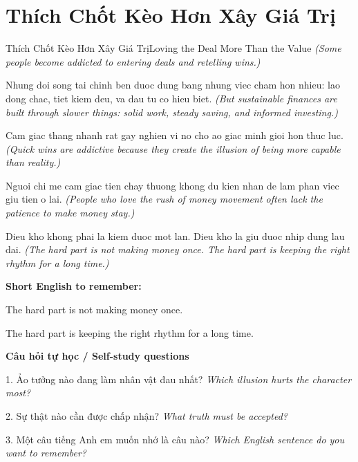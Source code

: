 \section{Thích Chốt Kèo Hơn Xây Giá Trị}
\begin{truyen}{Thích Chốt Kèo Hơn Xây Giá Trị}{Loving the Deal More Than the Value}
\textit{(Some people become addicted to entering deals and retelling wins.)}

Nhung doi song tai chinh ben duoc dung bang nhung viec cham hon nhieu: lao dong chac, tiet kiem deu, va dau tu co hieu biet.
\textit{(But sustainable finances are built through slower things: solid work, steady saving, and informed investing.)}

Cam giac thang nhanh rat gay nghien vi no cho ao giac minh gioi hon thuc luc.
\textit{(Quick wins are addictive because they create the illusion of being more capable than reality.)}

Nguoi chi me cam giac tien chay thuong khong du kien nhan de lam phan viec giu tien o lai.
\textit{(People who love the rush of money movement often lack the patience to make money stay.)}

\end{truyen}

\begin{baihoc}
Dieu kho khong phai la kiem duoc mot lan. Dieu kho la giu duoc nhip dung lau dai.
\textit{(The hard part is not making money once. The hard part is keeping the right rhythm for a long time.)}
\end{baihoc}

\begin{ghinhoanh}
\textbf{Short English to remember:}

The hard part is not making money once.

The hard part is keeping the right rhythm for a long time.

\end{ghinhoanh}

\begin{tuhocnhanh}
\textbf{Câu hỏi tự học / Self-study questions}

1. Ảo tưởng nào đang làm nhân vật đau nhất? \textit{Which illusion hurts the character most?}

2. Sự thật nào cần được chấp nhận? \textit{What truth must be accepted?}

3. Một câu tiếng Anh em muốn nhớ là câu nào? \textit{Which English sentence do you want to remember?}
\end{tuhocnhanh}
\ngancach

